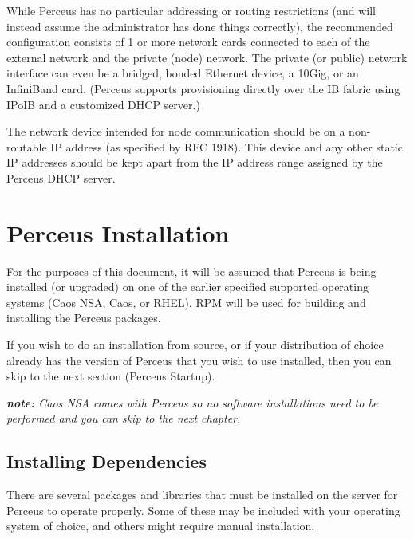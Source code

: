 \documentclass[10pt,letterpaper]{report}
\begin{document}
While Perceus has no particular addressing or routing restrictions (and will
instead assume the administrator has done things correctly), the recommended
configuration consists of 1 or more network cards connected to each of the
external network and the private (node) network.  The private (or public)
network interface can even be a bridged, bonded Ethernet device, a 10Gig, or
an InfiniBand card.  (Perceus supports provisioning directly over the IB
fabric using IPoIB and a customized DHCP server.)

The network device intended for node communication should be on a non-routable
IP address (as specified by RFC 1918).  This device and any other static IP
addresses should be kept apart from the IP address range assigned by the
Perceus DHCP server.

\section{Perceus Installation}

For the purposes of this document, it will be assumed that Perceus is being
installed (or upgraded) on one of the earlier specified supported operating
systems (Caos NSA, Caos, or RHEL).  RPM will be used for building and
installing the Perceus packages.

If you wish to do an installation from source, or if your distribution of
choice already has the version of Perceus that you wish to use installed, then
you can skip to the next section (Perceus Startup).

{\it {\bf note:} Caos NSA comes with Perceus so no software installations need
to be performed and you can skip to the next chapter.}

\subsection{Installing Dependencies}

There are several packages and libraries that must be installed on the server
for Perceus to operate properly. Some of these may be included with your
operating system of choice, and others might require manual installation.
\end{document}
